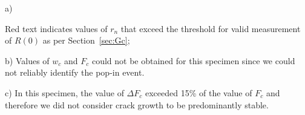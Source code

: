 \documentclass[12pt,onecolumn]{article}
\begin{document}
\begin{landscape}
\begin{table}
\begin{threeparttable}[t]
\begin{tabular}{rllllllllllllll}
\bottomrule
\end{tabular}
\begin{tablenotes}
\item[a)] {\footnotesize Red text indicates values of $r_n$ that exceed the threshold for valid measurement of $R(0)$ as per Section~\ref{sec:Gc};
\item[b)] Values of $w_c$ and $F_c$ could not be obtained for this specimen since we could not reliably identify the pop-in event.
\item[c)] In this specimen, the value of $\Delta F_c$ exceeded 15\% of the value of $F_c$ and therefore we did not consider crack growth to be predominantly stable.}
\end{tablenotes}
\end{threeparttable}
\end{table}

\end{landscape}
\restoregeometry

\end{document}
